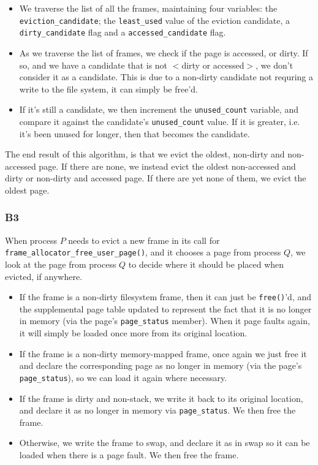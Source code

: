 \documentclass[a4wide, 11pt]{article}
\newcommand{\tx}{\texttt}
\begin{document}
\begin{itemize}
\item We traverse the list of all the frames, maintaining four variables: the \tx{eviction\_candidate}; the \tx{least\_used} value of the eviction candidate, a \tx{dirty\_candidate} flag and a \tx{accessed\_candidate} flag.

\item As we traverse the list of frames, we check if the page is accessed, or dirty. If so, and we have a candidate that is not $<$dirty or accessed$>$, we don't consider it as a candidate. This is due to a non-dirty candidate not requring a write to the file system, it can simply be free'd.

\item If it's still a candidate, we then increment the \tx{unused\_count} variable, and compare it against the candidate's \tx{unused\_count} value. If it is greater, i.e. it's been unused for longer, then that becomes the candidate.
\end{itemize}

The end result of this algorithm, is that we evict the oldest, non-dirty and non-accessed page. If there are none, we instead evict the oldest non-accessed and dirty or non-dirty and accessed page. If there are yet none of them, we evict the oldest page.

\subsubsection{B3}

When process $P$ needs to evict a new frame in its call for \tx{frame\_allocator\_free\_user\_page()}, and it chooses a page from process $Q$, we look at the page from process $Q$ to decide where it should be placed when evicted, if anywhere.

\begin{itemize}
\item If the frame is a non-dirty filesystem frame, then it can just be \tx{free()}'d, and the supplemental page table updated to represent the fact that it is no longer in memory (via the page's \tx{page\_status} member). When it page faults again, it will simply be loaded once more from its original location.
\item If the frame is a non-dirty memory-mapped frame, once again we just free it and declare the corresponding page as no longer in memory (via the page's \tx{page\_status}), so we can load it again where necessary.
\item If the frame is dirty and non-stack, we write it back to its original location, and declare it as no longer in memory via \tx{page\_status}. We then free the frame.
\item Otherwise, we write the frame to swap, and declare it as in swap so it can be loaded when there is a page fault. We then free the frame.
\end{itemize}
\end{document}
